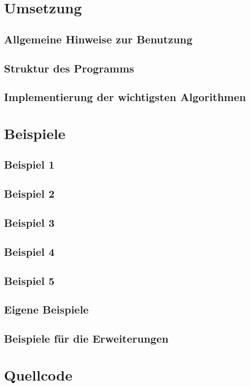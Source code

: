 \documentclass[a4paper, notitlepage, 12pt]{scrartcl}
\begin{document}
\section{Umsetzung}
\subsection{Allgemeine Hinweise zur Benutzung}
\subsection{Struktur des Programms}
\subsection{Implementierung der wichtigsten Algorithmen}

\section{Beispiele}
\subsection{Beispiel 1}
\subsection{Beispiel 2}
\subsection{Beispiel 3}
\subsection{Beispiel 4}
\subsection{Beispiel 5}
\subsection{Eigene Beispiele}
\subsection{Beispiele für die Erweiterungen}

 \section{Quellcode}
 \renewcommand{\listingscaption}{Quellcode}
 
 
\end{document}
